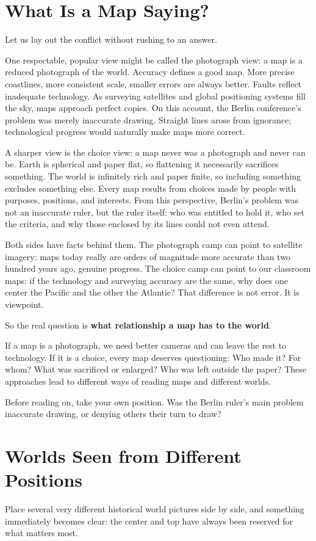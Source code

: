 \section{What Is a Map Saying?}
Let us lay out the conflict without rushing to an answer.

One respectable, popular view might be called the photograph view: a map is a reduced photograph of the world. Accuracy defines a good map. More precise coastlines, more consistent scale, smaller errors are always better. Faults reflect inadequate technology. As surveying satellites and global positioning systems fill the sky, maps approach perfect copies. On this account, the Berlin conference's problem was merely inaccurate drawing. Straight lines arose from ignorance; technological progress would naturally make maps more correct.

A sharper view is the choice view: a map never was a photograph and never can be. Earth is spherical and paper flat, so flattening it necessarily sacrifices something. The world is infinitely rich and paper finite, so including something excludes something else. Every map results from choices made by people with purposes, positions, and interests. From this perspective, Berlin's problem was not an inaccurate ruler, but the ruler itself: who was entitled to hold it, who set the criteria, and why those enclosed by its lines could not even attend.

Both sides have facts behind them. The photograph camp can point to satellite imagery: maps today really are orders of magnitude more accurate than two hundred years ago, genuine progress. The choice camp can point to our classroom maps: if the technology and surveying accuracy are the same, why does one center the Pacific and the other the Atlantic? That difference is not error. It is viewpoint.

So the real question is \textbf{what relationship a map has to the world}.

If a map is a photograph, we need better cameras and can leave the rest to technology. If it is a choice, every map deserves questioning: Who made it? For whom? What was sacrificed or enlarged? Who was left outside the paper? These approaches lead to different ways of reading maps and different worlds.

Before reading on, take your own position. Was the Berlin ruler's main problem inaccurate drawing, or denying others their turn to draw?

\section{Worlds Seen from Different Positions}
Place several very different historical world pictures side by side, and something immediately becomes clear: the center and top have always been reserved for what matters most.

